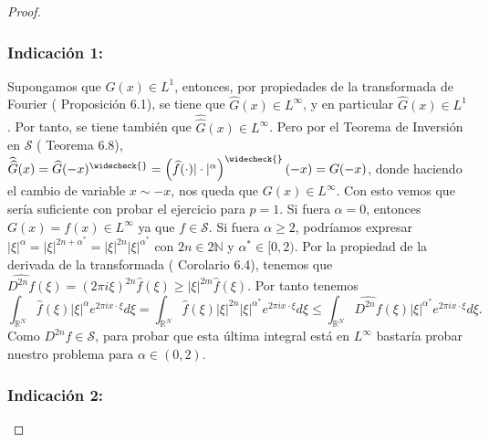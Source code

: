 \documentclass[11pt,a4paper]{article}
\begin{document}
\begin{proof}
    \
    \subsubsection*{Indicación 1:}
    Supongamos que $ G(x) \in L^1$, entonces, por propiedades de la transformada de Fourier (\cite{Soria} Proposición 6.1), se tiene que $ \widehat G(x) \in L^\infty $, y en particular $ \widehat G(x) \in L^1$. Por tanto, se tiene también que $ \widehat{\widehat G}(x) \in L^\infty$. Pero por el Teorema de Inversión en $\mathscr{S}$ (\cite{Soria} Teorema 6.8), $ \widehat{\widehat G} (x) = \widehat G(-x)^{\widecheck{}} = \left(\widehat f(\cdot)|\cdot|^\alpha\right)^{\widecheck{}}(-x) = G(-x)$, donde haciendo el cambio de variable $ x \sim -x $, nos queda que $ G(x) \in L^\infty $. Con esto vemos que sería suficiente con probar el ejercicio para $ p = 1 $.
    \vskip 5mm
    Si fuera $ \alpha = 0 $, entonces $ G(x) = f(x) \in L^\infty $ ya que $ f \in \mathscr S$. Si fuera $ \alpha \ge 2 $, podríamos expresar $ |\xi|^\alpha = |\xi|^{2n + \alpha^*} = |\xi|^{2n} |\xi|^{\alpha^*}$ con $ 2n \in 2\mathbb N $ y $\alpha^* \in [0, 2)$. Por la propiedad de la derivada de la transformada (\cite{Soria} Corolario 6.4), tenemos que $ \widehat{D^{2n}f}(\xi) = (2 \pi i \xi)^{2n} \widehat f (\xi) \ge |\xi|^{2m} \widehat f (\xi)$. Por tanto tenemos
    $$
    \int_{\mathbb R^N}
    \widehat f(\xi)|\xi|^\alpha e^{2\pi ix\cdot\xi}d\xi = \int_{\mathbb R^N}
    \widehat f(\xi) |\xi|^{2n} |\xi|^{\alpha^*} e^{2\pi ix\cdot\xi}d\xi \le \int_{\mathbb R^N}
    \widehat{D^{2n}f}(\xi) |\xi|^{\alpha^*} e^{2\pi ix\cdot\xi}d\xi.
    $$
    Como $ D^{2n}f \in \mathscr S $, para probar que esta última integral está en $ L^\infty $ bastaría probar nuestro problema para $ \alpha \in (0, 2)$. 

    \newpage

    \subsubsection*{Indicación 2:}
    


\end{proof}
\end{document}

